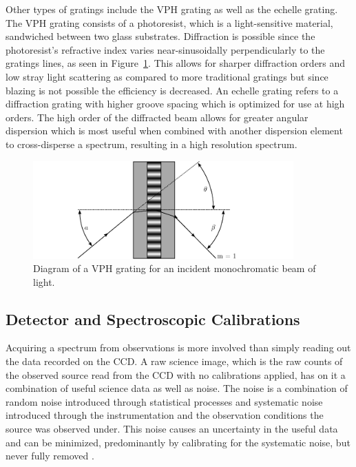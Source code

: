 Other types of gratings include the \gls{VPH} grating as well as the echelle grating. The \gls{VPH} grating consists of a photoresist, which is a light-sensitive material, sandwiched between two glass substrates. Diffraction is possible since the photoresist's refractive index varies near-sinusoidally perpendicularly to the gratings lines, as seen in Figure~\ref{fig:vph_grating}. This allows for sharper diffraction orders and low stray light scattering as compared to more traditional gratings but since blazing is not possible the efficiency is decreased. An echelle grating refers to a diffraction grating with higher groove spacing which is optimized for use at high orders. The high order of the diffracted beam allows for greater angular dispersion which is most useful when combined with another dispersion element to cross-disperse a spectrum, resulting in a high resolution spectrum.

\begin{figure}[t]
  \centering
  \includegraphics[width = 10cm]{figures/2_vph_grating.pdf}
  \caption{Diagram of a \gls{VPH} grating for an incident monochromatic beam of light.}
  \label{fig:vph_grating}
\end{figure}

\subsection{Detector and Spectroscopic Calibrations}\label{subsec:calibration}

Acquiring a spectrum from observations is more involved than simply reading out the data recorded on the \gls{CCD}. A raw science image, which is the raw counts of the observed source read from the \gls{CCD} with no calibrations applied, has on it a combination of useful science data as well as noise. The noise is a combination of random noise introduced through statistical processes and systematic noise introduced through the instrumentation and the observation conditions the source was observed under. This noise causes an uncertainty in the useful data and can be minimized, predominantly by calibrating for the systematic noise, but never fully removed \citep{CCDhandbook}.
\prgph

